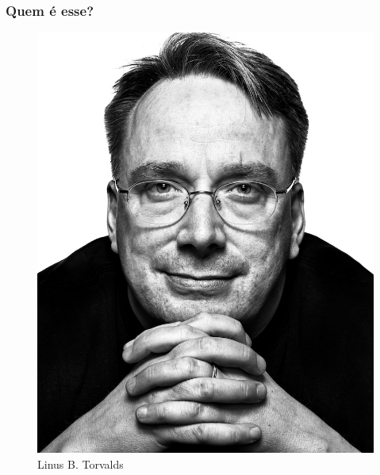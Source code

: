 \documentclass[xcolor=dvipsnames]{beamer}
\begin{document}
\begin{frame}
	\frametitle{Quem é esse?}
	\begin{figure}
	\begin{center}
	\includegraphics[scale=0.2]{lbt.jpg}\\
	\pause
	Linus B. Torvalds
	\end{center}
	\end{figure}
\end{frame}
\end{document}
